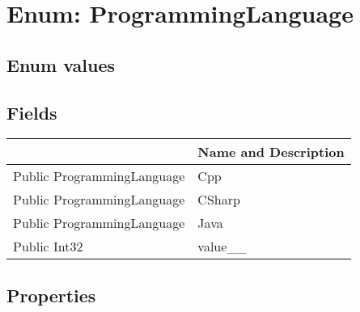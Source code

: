 \documentclass[11pt, oneside, a4paper]{book}
\begin{document}
\section{Enum: ProgrammingLanguage}

\subsection{Enum values}

\subsection{Fields}
\begin{center}
\begin{tabular}{| p{3cm} | p{12cm} | }
\hline
\textbf{ } & \textbf{ Name and Description}\\
\hline
 Public  ProgrammingLanguage &  Cpp\hypertarget{SoftwareEngineeringTools.{}Documentation.{}ProgrammingLanguage.{}Cpp}{}\\
\hline
 Public  ProgrammingLanguage &  CSharp\hypertarget{SoftwareEngineeringTools.{}Documentation.{}ProgrammingLanguage.{}CSharp}{}\\
\hline
 Public  ProgrammingLanguage &  Java\hypertarget{SoftwareEngineeringTools.{}Documentation.{}ProgrammingLanguage.{}Java}{}\\
\hline
 Public  Int32 &  value\_\_\hypertarget{SoftwareEngineeringTools.{}Documentation.{}ProgrammingLanguage.{}value\_\_}{}\\
\hline
\end{tabular}
\end{center}

\subsection{Properties}
\end{document}
